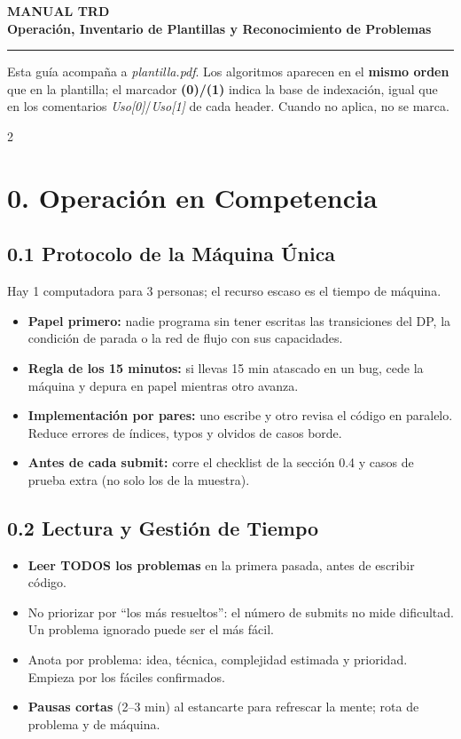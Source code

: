 \documentclass[10pt]{article}
\begin{document}
\begin{center}
  {\Large\textbf{MANUAL TRD}}\\[2pt]
  {\small\textbf{Operación, Inventario de Plantillas y Reconocimiento de Problemas}}
\end{center}
\vspace{-4pt}
\hrule
\vspace{6pt}

\noindent\small Esta guía acompaña a \textit{plantilla.pdf}. Los algoritmos aparecen en el \textbf{mismo orden} que en la plantilla; el marcador \textbf{(0)/(1)} indica la base de indexación, igual que en los comentarios \textit{Uso[0]}/\textit{Uso[1]} de cada header. Cuando no aplica, no se marca.

\begin{multicols}{2}

\section*{0. Operación en Competencia}

\subsection*{0.1 Protocolo de la Máquina Única}
Hay 1 computadora para 3 personas; el recurso escaso es el tiempo de máquina.
\begin{itemize}\setlength{\itemsep}{1pt}
  \item \textbf{Papel primero:} nadie programa sin tener escritas las transiciones del DP, la condición de parada o la red de flujo con sus capacidades.
  \item \textbf{Regla de los 15 minutos:} si llevas 15 min atascado en un bug, cede la máquina y depura en papel mientras otro avanza.
  \item \textbf{Implementación por pares:} uno escribe y otro revisa el código en paralelo. Reduce errores de índices, typos y olvidos de casos borde.
  \item \textbf{Antes de cada submit:} corre el checklist de la sección 0.4 y casos de prueba extra (no solo los de la muestra).
\end{itemize}

\subsection*{0.2 Lectura y Gestión de Tiempo}
\begin{itemize}\setlength{\itemsep}{1pt}
  \item \textbf{Leer TODOS los problemas} en la primera pasada, antes de escribir código.
  \item No priorizar por ``los más resueltos'': el número de submits no mide dificultad. Un problema ignorado puede ser el más fácil.
  \item Anota por problema: idea, técnica, complejidad estimada y prioridad. Empieza por los fáciles confirmados.
  \item \textbf{Pausas cortas} (2--3 min) al estancarte para refrescar la mente; rota de problema y de máquina.
\end{itemize}


\end{multicols}
\end{document}
